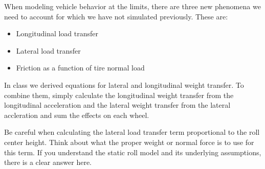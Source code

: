 
When modeling vehicle behavior at the limits, there are three new phenomena we need to account for which we have not
simulated previously. These are:

\begin{itemize}
    \item Longitudinal load transfer
    \item Lateral load transfer
    \item Friction as a function of tire normal load
\end{itemize}

In class we derived equations for lateral and longitudinal weight transfer. To combine them, simply calculate the
longitudinal weight transfer from the longitudinal acceleration and the lateral weight transfer from the lateral
accleration and sum the effects on each wheel. 

Be careful when calculating the lateral load transfer term proportional to the roll center height.  Think about what the proper weight or normal force is to use for this term.  If you understand the static roll model and its underlying assumptions, there is a clear answer here.

\vspace*{0.5cm}
